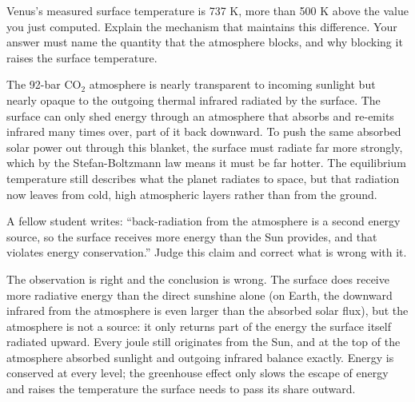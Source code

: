 \parti Venus's measured surface temperature is 737 K, more than 500 K above the value you just computed.
Explain the mechanism that maintains this difference. Your answer must name the quantity that the
atmosphere blocks, and why blocking it raises the surface temperature.

\begin{solution}
The 92-bar $\mathrm{CO_2}$ atmosphere is nearly transparent to incoming sunlight but nearly opaque to
the outgoing thermal infrared radiated by the surface.
The surface can only shed energy through an atmosphere that absorbs and re-emits infrared many times over,
part of it back downward.
To push the same absorbed solar power out through this blanket, the surface must radiate far more strongly,
which by the Stefan-Boltzmann law means it must be far hotter.
The equilibrium temperature still describes what the planet radiates to space, but that radiation now
leaves from cold, high atmospheric layers rather than from the ground.
\end{solution}

\parti A fellow student writes: ``back-radiation from the atmosphere is a second energy source,
so the surface receives more energy than the Sun provides, and that violates energy conservation.''
Judge this claim and correct what is wrong with it.

\begin{solution}
The observation is right and the conclusion is wrong.
The surface does receive more radiative energy than the direct sunshine alone (on Earth, the downward
infrared from the atmosphere is even larger than the absorbed solar flux), but the atmosphere is not a
source: it only returns part of the energy the surface itself radiated upward.
Every joule still originates from the Sun, and at the top of the atmosphere absorbed sunlight and
outgoing infrared balance exactly.
Energy is conserved at every level; the greenhouse effect only slows the escape of energy and raises the
temperature the surface needs to pass its share outward.
\end{solution}


